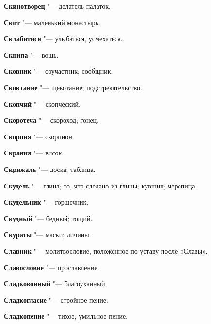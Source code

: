 \begin{mymulticols}{2}
\noindent\textbf{Скинотворец} "--- делатель палаток. 




\noindent\textbf{Скит} "--- маленький монастырь. 




\noindent\textbf{Склабитися} "--- улыбаться, усмехаться. 




\noindent\textbf{Скнипа} "--- вошь. 




\noindent\textbf{Сковник} "--- соучастник; сообщник. 




\noindent\textbf{Скоктание} "--- щекотание; подстрекательство. 




\noindent\textbf{Скопчий} "--- скопческий. 




\noindent\textbf{Скоротеча} "--- скороход; гонец. 




\noindent\textbf{Скорпия} "--- скорпион. 




\noindent\textbf{Скрания} "--- висок. 




\noindent\textbf{Скрижаль} "--- доска; таблица. 




\noindent\textbf{Скудель} "--- глина; то, что сделано из глины; кувшин; черепица. 




\noindent\textbf{Скудельник} "--- горшечник. 




\noindent\textbf{Скудный} "--- бедный; тощий. 




\noindent\textbf{Скураты} "--- маски; личины. 




\noindent\textbf{Славник} "--- молитвословие, положенное по уставу после «Славы». 




\noindent\textbf{Славословие} "--- прославление. 




\noindent\textbf{Сладковонный} "--- благоуханный. 




\noindent\textbf{Сладкогласие} "--- стройное пение. 




\noindent\textbf{Сладкопение} "--- тихое, умильное пение. 





\end{mymulticols}
